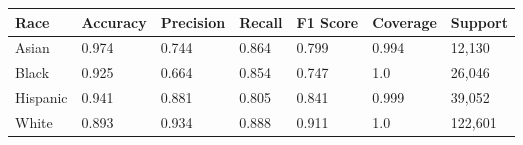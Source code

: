 \begin{tabular}{lllllll}
\toprule
Race & Accuracy & Precision & Recall & F1 Score & Coverage & Support \\
\midrule
Asian & 0.974 & 0.744 & 0.864 & 0.799 & 0.994 & 12,130 \\
Black & 0.925 & 0.664 & 0.854 & 0.747 & 1.0 & 26,046 \\
Hispanic & 0.941 & 0.881 & 0.805 & 0.841 & 0.999 & 39,052 \\
White & 0.893 & 0.934 & 0.888 & 0.911 & 1.0 & 122,601 \\
\bottomrule
\end{tabular}
